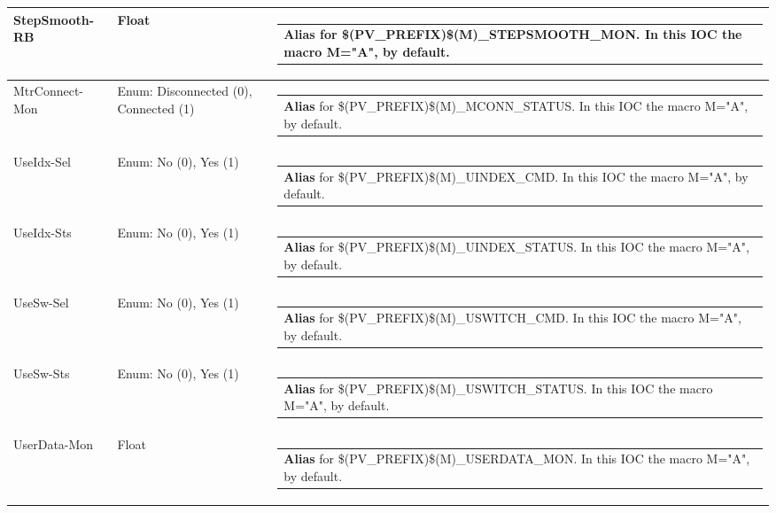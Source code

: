 \documentclass[openany]{article}
\begin{document}
\begin{longtable}{| m{4.5cm} m{2.5cm}  m{8.5cm} |}
        StepSmooth-RB & Float & \begin{tabular}{@{}m{6cm}@{}}
                \textbf{\color{blue} Alias} for \$(PV\_PREFIX)\$(M)\_STEPSMOOTH\_MON. In this IOC the macro M="A", by default.
            \end{tabular} \hypertarget{pv:mtr-connect-mon}{}\\ \hline
        MtrConnect-Mon & Enum: Disconnected (0), Connected (1) & \begin{tabular}{@{}m{6cm}@{}}
                \textbf{\color{blue} Alias} for \$(PV\_PREFIX)\$(M)\_MCONN\_STATUS. In this IOC the macro M="A", by default.
            \end{tabular} \hypertarget{pv:use-idx}{}\\ \hline
        UseIdx-Sel & Enum: No (0), Yes (1) & \begin{tabular}{@{}m{6cm}@{}}
                \textbf{\color{blue} Alias} for \$(PV\_PREFIX)\$(M)\_UINDEX\_CMD. In this IOC the macro M="A", by default.
            \end{tabular} \hypertarget{}{}\\ \hline
        UseIdx-Sts & Enum: No (0), Yes (1) & \begin{tabular}{@{}m{6cm}@{}}
                \textbf{\color{blue} Alias} for \$(PV\_PREFIX)\$(M)\_UINDEX\_STATUS. In this IOC the macro M="A", by default.
            \end{tabular} \hypertarget{pv:use-sw}{}\\ \hline
        UseSw-Sel & Enum: No (0), Yes (1) & \begin{tabular}{@{}m{6cm}@{}}
                \textbf{\color{blue} Alias} for \$(PV\_PREFIX)\$(M)\_USWITCH\_CMD. In this IOC the macro M="A", by default.
            \end{tabular} \hypertarget{}{}\\ \hline
        UseSw-Sts & Enum: No (0), Yes (1) & \begin{tabular}{@{}m{6cm}@{}}
                \textbf{\color{blue} Alias} for \$(PV\_PREFIX)\$(M)\_USWITCH\_STATUS. In this IOC the macro M="A", by default.
            \end{tabular} \hypertarget{pv:user-data-mon}{}\\ \hline
        UserData-Mon & Float & \begin{tabular}{@{}m{6cm}@{}}
                \textbf{\color{blue} Alias} for \$(PV\_PREFIX)\$(M)\_USERDATA\_MON. In this IOC the macro M="A", by default.

\end{tabular}
\end{longtable}
\end{document}
